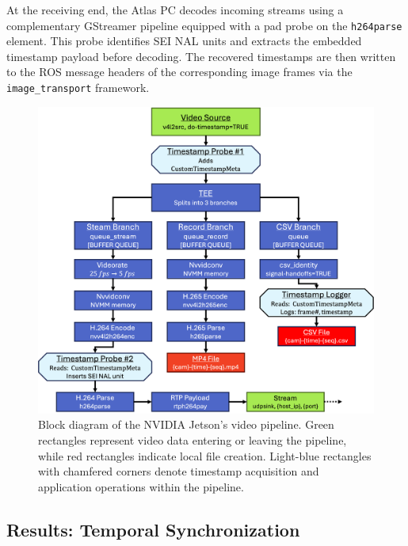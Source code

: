 \documentclass[../main.tex]{subfiles}
\begin{document}
At the receiving end, the Atlas PC decodes incoming streams using a complementary GStreamer pipeline equipped with a pad probe on the \texttt{h264parse} element. This probe identifies SEI NAL units and extracts the embedded timestamp payload before decoding. The recovered timestamps are then written to the ROS message headers of the corresponding image frames via the \texttt{image\_transport} framework.


\begin{figure}[htbp]
\centering
\includegraphics[width=5in]{Images/gstreamer_block.png}
\caption{Block diagram of the NVIDIA Jetson's video pipeline. Green rectangles represent video data entering or leaving the pipeline, while red rectangles indicate local file creation. Light-blue rectangles with chamfered corners denote timestamp acquisition and application operations within the pipeline.}
\label{video_pipeline}
\end{figure}
\subsection{Results: Temporal Synchronization} \label{results)time_sync_cam}
\end{document}
